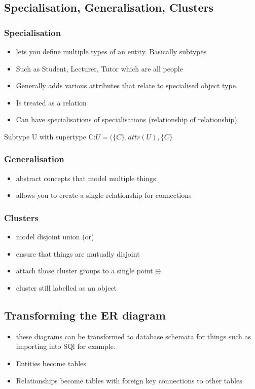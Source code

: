 \documentclass{article}
\newcommand\tab[1][0.5cm]{\hspace*{#1}}
\begin{document}
	\subsection{Specialisation, Generalisation, Clusters}
		\subsubsection{Specialisation}
			\begin{itemize}
				\item lets you define multiple types of an entity. Basically subtypes
				\item Such as Student, Lecturer, Tutor which are all people
				\item Generally adds various attributes that relate to specialised object type.
				\item Is treated as a relation
				\item Can have specialisations of specialisations (relationship of relationship)
			\end{itemize}

			Subtype U with supertype C:\tab\tab $U = (\{C\}, attr(U),\{C\}$

		\subsubsection{Generalisation}
			\begin{itemize}
				\item abstract concepts that model multiple things
				\item allows you to create a single relationship for connections
			\end{itemize}

		\subsubsection{Clusters}
			\begin{itemize}
				\item model disjoint union (or)
				\item ensure that things are mutually disjoint
				\item attach those cluster groups to a single point $\oplus$
				\item cluster still labelled as an object
			\end{itemize}

	\subsection{Transforming the ER diagram}
		\begin{itemize}
			\item these diagrams can be transformed to database schemata for things such as importing into SQl for example.
			\item Entities become tables
			\item Relationships become tables with foreign key connections to other tables
		\end{itemize}
\end{document}
